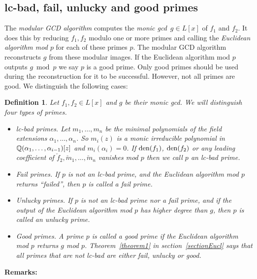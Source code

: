 \documentclass[10pt]{article}
\newtheorem{definition}{Definition}
\newcommand{\Q}{\QQ}
\newcommand{\bad}{lc-bad }
\begin{document}
\subsection{lc-bad, fail, unlucky and good primes}
The {\em modular GCD algorithm} computes the {\em monic gcd}\ 
$g \in L[x]$ of $f_1$ and $f_2$.
It does this by reducing $f_1,f_2$ modulo one or more primes
and calling the {\em Euclidean algorithm mod $p$} for each of these primes $p$.
The modular GCD algorithm reconstructs $g$ from these modular images.
If the Euclidean algorithm mod $p$ outputs $g \bmod p$ we say $p$ is a good prime.
Only good primes should be used during the reconstruction for it to
be successful.
However, not all primes are good. We distinguish the following cases:
\begin{definition}
\label{definitionbad}
Let $f_1,f_2 \in L[x]$ and $g$ be their monic gcd.
We will distinguish four types of primes.
\begin{itemize}
\item {\em \bad primes}.
Let $m_1,\ldots,m_n$ be the minimal polynomials of the 
field extensions $\alpha_1,\ldots,\alpha_n$.
So $m_i(z)$ is a monic irreducible polynomial in 
$\Q(\alpha_1,\ldots,\alpha_{i-1})[z]$ and $m_i(\alpha_i)=0$.
If ${\rm den}(f_1)$, ${\rm den}(f_2)$ or
any leading coefficient of $\check{f}_2,\check{m}_1,\ldots,\check{m}_n$
vanishes mod $p$ then we call $p$ an {\em \bad prime}.

\item {\em Fail primes}.
If $p$ is not an \bad prime, and the Euclidean algorithm
mod $p$ returns ``failed'', then $p$ is called a {\em fail prime}.

\item {\em Unlucky primes}.
If $p$ is not an \bad prime nor a fail prime, and if the
output of the Euclidean algorithm mod $p$ has higher degree than $g$,
then $p$ is called an {\em unlucky prime}.

\item {\em Good primes}.
A prime $p$ is called a {\em good prime} if the Euclidean algorithm mod $p$
returns $g$ mod $p$.
Theorem~\ref{theorem1} in section~\ref{sectionEucl} says that all primes
that are not \bad are either fail, unlucky or good.
\end{itemize}
\end{definition}
{\bf Remarks:}
\end{document}
